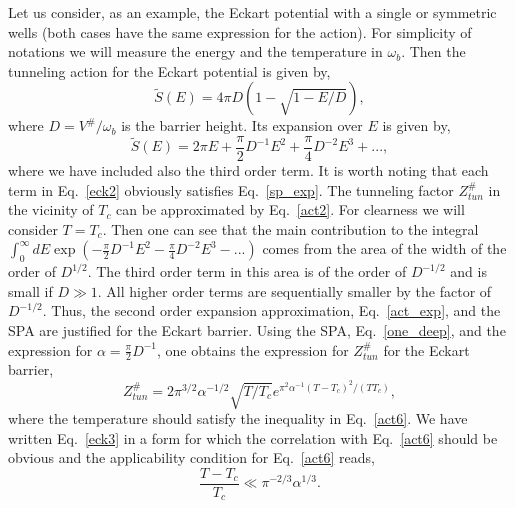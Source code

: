 \documentclass[journal=jpcafh,manuscript=article]{achemso}
\begin{document}
Let us consider, as an example, the Eckart potential\cite{eckart30} with a single or
symmetric wells (both cases have the same expression for the
action). For simplicity of notations we will measure the energy and
the temperature in $\omega_b$. Then the tunneling action for the
Eckart potential is given by,
\begin{equation}
  \label{eck1}
  \tilde{S}(E)=4\pi D(1-\sqrt{1-E/D}),
\end{equation}
where $D=V^\#/\omega_b$ is the barrier height. Its expansion over $E$ is given by,
\begin{equation}
  \label{eck2}
  \tilde{S}(E)=2\pi E + \frac{\pi}{2}D^{-1}E^2+\frac{\pi}{4}D^{-2}E^3+...,
\end{equation}
where we have included also the third order term. It is worth noting
that each term in Eq.~\ref{eck2} obviously satisfies
Eq.~\ref{sp_exp}. The tunneling factor $Z^\#_{tun}$ in the vicinity of
$T_c$ can be approximated by Eq.~\ref{act2}. For clearness we will
consider $T=T_c$. Then one can see that the main contribution to the
integral
$\int_0^{\infty}dE\exp(-\frac{\pi}{2}D^{-1}E^2-\frac{\pi}{4}D^{-2}E^3-...)$
comes from the area of the width of the order of $D^{1/2}$. The third
order term in this area is of the order of $D^{-1/2}$ and is small if
$D\gg 1$. All higher order terms are sequentially smaller by the
factor of $D^{-1/2}$. Thus, the second order expansion approximation,
Eq.~\ref{act_exp}, and the SPA are justified for the Eckart barrier.
Using the SPA, Eq.~\ref{one_deep}, and the expression for
$\alpha=\frac{\pi}{2}D^{-1}$, one obtains the expression for
$Z^\#_{tun}$ for the Eckart barrier,
\begin{equation}
  \label{eck3}
  Z^\#_{tun}=2\pi^{3/2}\alpha^{-1/2}\sqrt{T/T_c}
  e^{\pi^2\alpha^{-1}(T-T_c)^2/(TT_c)},
\end{equation}
where the temperature should satisfy the inequality in Eq.~\ref{act6}.
We have written Eq.~\ref{eck3} in a form for which the correlation with
Eq.~\ref{act6} should be obvious
and the applicability condition for Eq.~\ref{act6} reads,
\begin{equation}
  \label{eck4}
  \frac{T-T_c}{T_c}\ll \pi^{-2/3}\alpha^{1/3}.
\end{equation}
\end{document}
